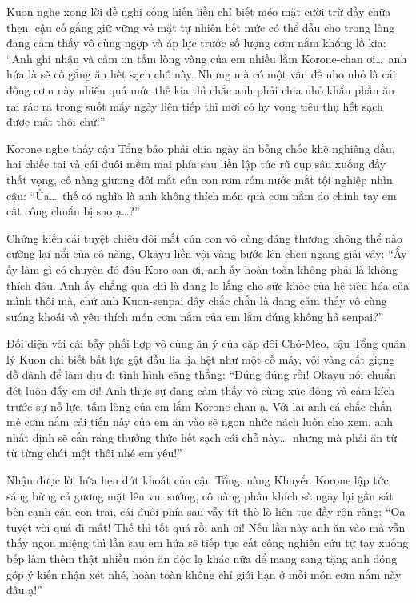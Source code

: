 \documentclass[../main.tex]{subfiles}
\begin{document}
Kuon nghe xong lời đề nghị cống hiến liền chỉ biết méo mặt cười trừ đầy chữa thẹn, cậu cố gắng giữ vững vẻ mặt tự nhiên hết mức có thể dẫu cho trong lòng đang cảm thấy vô cùng ngợp và áp lực trước số lượng cơm nắm khổng lồ kia: ``Anh ghi nhận và cảm ơn tấm lòng vàng của em nhiều lắm Korone-chan ơi\dots\ anh hứa là sẽ cố gắng ăn hết sạch chỗ này. Nhưng mà có một vấn đề nho nhỏ là cái đống cơm này nhiều quá mức thế kia thì chắc anh phải chia nhỏ khẩu phần ăn rải rác ra trong suốt mấy ngày liên tiếp thì mới có hy vọng tiêu thụ hết sạch được mất thôi chứ!''

Korone nghe thấy cậu Tổng bảo phải chia ngày ăn bỗng chốc khẽ nghiêng đầu, hai chiếc tai và cái đuôi mềm mại phía sau liền lập tức rũ cụp sâu xuống đầy thất vọng, cô nàng giương đôi mắt cún con rơm rớm nước mắt tội nghiệp nhìn cậu: ``Ủa\dots\ thế có nghĩa là anh không thích món quà cơm nắm do chính tay em cất công chuẩn bị sao ạ\dots?''

Chứng kiến cái tuyệt chiêu đôi mắt cún con vô cùng đáng thương không thể nào cưỡng lại nổi của cô nàng, Okayu liền vội vàng bước lên chen ngang giải vây: ``Ấy ấy làm gì có chuyện đó đâu Koro-san ơi, anh ấy hoàn toàn không phải là không thích đâu. Anh ấy chẳng qua chỉ là đang lo lắng cho sức khỏe của hệ tiêu hóa của mình thôi mà, chứ anh Kuon-senpai đây chắc chắn là đang cảm thấy vô cùng sướng khoái và yêu thích món cơm nắm của em lắm đúng không hả senpai?''

Đối diện với cái bẫy phối hợp vô cùng ăn ý của cặp đôi Chó-Mèo, cậu Tổng quản lý Kuon chỉ biết bất lực gật đầu lia lịa hệt như một cỗ máy, vội vàng cất giọng dỗ dành để làm dịu đi tình hình căng thẳng: ``Đúng đúng rồi! Okayu nói chuẩn đét luôn đấy em ơi! Anh thực sự đang cảm thấy vô cùng xúc động và cảm kích trước sự nỗ lực, tấm lòng của em lắm Korone-chan ạ. Với lại anh cá chắc chắn mẻ cơm nắm cải tiến này của em ăn vào sẽ ngon nhức nách luôn cho xem, anh nhất định sẽ cắn răng thưởng thức hết sạch cái chỗ này\dots\ nhưng mà phải ăn từ từ từng chút một thôi nhé em yêu!''

Nhận được lời hứa hẹn dứt khoát của cậu Tổng, nàng Khuyển Korone lập tức sáng bừng cả gương mặt lên vui sướng, cô nàng phấn khích sà ngay lại gần sát bên cạnh cậu con trai, cái đuôi phía sau vẫy tít thò lò liên tục đầy rộn ràng: ``Oa tuyệt vời quá đi mất! Thế thì tốt quá rồi anh ơi! Nếu lần này anh ăn vào mà vẫn thấy ngon miệng thì lần sau em hứa sẽ tiếp tục cất công nghiên cứu tự tay xuống bếp làm thêm thật nhiều món ăn độc lạ khác nữa để mang sang tặng anh đóng góp ý kiến nhận xét nhé, hoàn toàn không chỉ giới hạn ở mỗi món cơm nắm này đâu ạ!''
\end{document}
